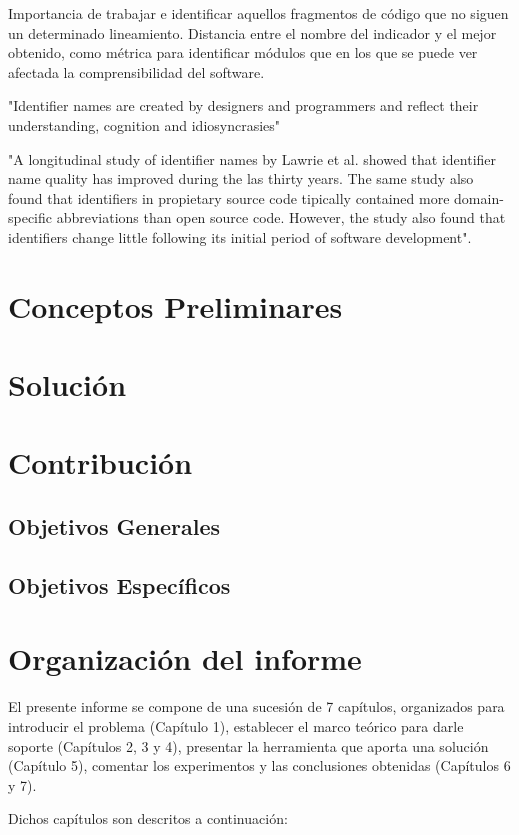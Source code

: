 Importancia de trabajar e identificar aquellos fragmentos de código que no siguen un
determinado lineamiento.
Distancia entre el nombre del indicador y el mejor obtenido, como métrica para identificar
módulos que en los que se puede ver afectada la comprensibilidad del software.

"Identifier names are created by designers and programmers and reflect their
understanding, cognition and idiosyncrasies" \cite{HostOstvold07}

"A longitudinal study of identifier names by Lawrie et al. \cite{Lawrie2007} showed that
identifier name quality has improved during the las thirty years. 
The same study also found
that identifiers in propietary source code tipically contained more domain-specific
abbreviations than open source code.
However, the study also found that identifiers change little following its initial period
of software development".

\section{Conceptos Preliminares}

\section{Solución}

\section{Contribución}
\subsection{Objetivos Generales}
\subsection{Objetivos Específicos}

\section{Organización del informe}
El presente informe se compone de una sucesión de 7 capítulos, organizados para introducir
el problema (Capítulo 1), establecer el marco teórico para darle soporte (Capítulos 2, 3 y 4),
presentar la herramienta que aporta una solución (Capítulo 5), comentar los experimentos y
las conclusiones obtenidas (Capítulos 6 y 7).

Dichos capítulos son descritos a continuación:

